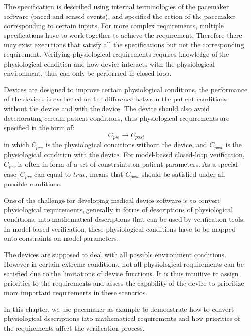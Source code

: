 The specification is described using internal terminologies of the pacemaker software (paced and sensed events), and specified the action of the pacemaker corresponding to certain inputs. For more complex requirements, multiple specifications have to work together to achieve the requirement. Therefore there may exist executions that satisfy all the specifications but not the corresponding requirement. Verifying physiological requirements requires knowledge of the physiological condition and how device interacts with the physiological environment, thus can only be performed in closed-loop. 

Devices are designed to improve certain physiological conditions, the performance of the devices is evaluated on the difference between the patient conditions without the device and with the device. The device should also avoid deteriorating certain patient conditions, thus physiological requirements are specified in the form of:
$$C_{pre}\rightarrow C_{post}$$
in which $C_{pre}$ is the physiological conditions without the device,  and $C_{post}$ is the physiological condition with the device. For model-based closed-loop verification, $C_{pre}$ is often in form of a set of constraints on patient parameters. As a special case, $C_{pre}$ can equal to $true$, means that $C_{post}$ should be satisfied under all possible conditions.

One of the challenge for developing medical device software is to convert physiological requirements, generally in forms of descriptions of physiological conditions, into mathematical descriptions that can be used by verification tools.  In model-based verification, these physiological conditions have to be mapped onto constraints on model parameters. %

The devices are supposed to deal with all possible environment conditions. However in certain extreme conditions, not all physiological requirements can be satisfied due to the limitations of device functions. It is thus intuitive to assign priorities to the requirements and assess the capability of the device to prioritize more important requirements in these scenarios. 

In this chapter, we use pacemaker as example to demonstrate how to convert physiological descriptions into mathematical requirements and how priorities of the requirements affect the verification process.


